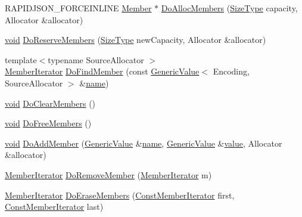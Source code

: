 \begin{DoxyCompactItemize}
\item 
R\+A\+P\+I\+D\+J\+S\+O\+N\+\_\+\+F\+O\+R\+C\+E\+I\+N\+L\+I\+NE \hyperlink{classGenericValue_a7ccf27c44058b4c11c3efc6473afb886}{Member} $\ast$ \hyperlink{classGenericValue_af1c2af5189d3522bc885cb4101d1019d}{Do\+Alloc\+Members} (\hyperlink{rapidjson_8h_a5ed6e6e67250fadbd041127e6386dcb5}{Size\+Type} capacity, Allocator \&allocator)
\item 
\hyperlink{imgui__impl__opengl3__loader_8h_ac668e7cffd9e2e9cfee428b9b2f34fa7}{void} \hyperlink{classGenericValue_a37e400c98968dec21293861983db9b06}{Do\+Reserve\+Members} (\hyperlink{rapidjson_8h_a5ed6e6e67250fadbd041127e6386dcb5}{Size\+Type} new\+Capacity, Allocator \&allocator)
\item 
{\footnotesize template$<$typename Source\+Allocator $>$ }\\\hyperlink{classGenericValue_a349b8faae61edc42b4289726820be439}{Member\+Iterator} \hyperlink{classGenericValue_a62e070232ca1bab936de08b8dbf41a5d}{Do\+Find\+Member} (const \hyperlink{classGenericValue}{Generic\+Value}$<$ Encoding, Source\+Allocator $>$ \&\hyperlink{imgui__impl__opengl3__loader_8h_a5c4947d4516dd7cfa3505ce3a648a4ef}{name})
\item 
\hyperlink{imgui__impl__opengl3__loader_8h_ac668e7cffd9e2e9cfee428b9b2f34fa7}{void} \hyperlink{classGenericValue_a4e2fbcde9054e87b591f79e6202a80d6}{Do\+Clear\+Members} ()
\item 
\hyperlink{imgui__impl__opengl3__loader_8h_ac668e7cffd9e2e9cfee428b9b2f34fa7}{void} \hyperlink{classGenericValue_aab3a51f8207a44ad87a1f8b0bbf53fe9}{Do\+Free\+Members} ()
\item 
\hyperlink{imgui__impl__opengl3__loader_8h_ac668e7cffd9e2e9cfee428b9b2f34fa7}{void} \hyperlink{classGenericValue_a741c527ec9552ec0a7dce92f7b22d1c6}{Do\+Add\+Member} (\hyperlink{classGenericValue}{Generic\+Value} \&\hyperlink{imgui__impl__opengl3__loader_8h_a5c4947d4516dd7cfa3505ce3a648a4ef}{name}, \hyperlink{classGenericValue}{Generic\+Value} \&\hyperlink{imgui__impl__opengl3__loader_8h_a32aff7c6c4cd253fdf6563677afab5ce}{value}, Allocator \&allocator)
\item 
\hyperlink{classGenericValue_a349b8faae61edc42b4289726820be439}{Member\+Iterator} \hyperlink{classGenericValue_a6db9c0ed0d2417d00b135195e3546f50}{Do\+Remove\+Member} (\hyperlink{classGenericValue_a349b8faae61edc42b4289726820be439}{Member\+Iterator} m)
\item 
\hyperlink{classGenericValue_a349b8faae61edc42b4289726820be439}{Member\+Iterator} \hyperlink{classGenericValue_a786fc0f1116ef209216884b13f814158}{Do\+Erase\+Members} (\hyperlink{classGenericValue_aac08c3e660a9036d3dcb8b10ff6c61f4}{Const\+Member\+Iterator} first, \hyperlink{classGenericValue_aac08c3e660a9036d3dcb8b10ff6c61f4}{Const\+Member\+Iterator} last)

\end{DoxyCompactItemize}
